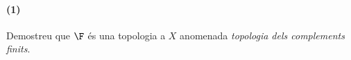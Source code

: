 \paragraph{(1)} 
Demostreu que $\F$ és una topologia a $X$ anomenada {\it topologia dels complements finits}.\\
